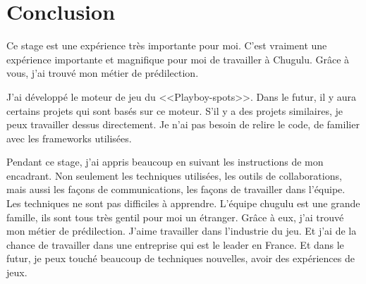\chapter{Conclusion}

Ce stage est une expérience très importante pour moi. C’est vraiment une expérience importante et magnifique pour moi de travailler à Chugulu. Grâce à vous, j’ai trouvé mon métier de prédilection.

J’ai développé le moteur de jeu du <<Playboy-spots>>. Dans le futur, il y aura certains projets qui sont basés sur ce moteur. S'il y a des projets similaires, je peux travailler dessus directement. Je n’ai pas besoin de relire le code, de familier avec les frameworks utilisées. 

Pendant ce stage, j’ai appris beaucoup en suivant les instructions de mon encadrant. Non seulement les techniques utilisées, les outils de collaborations, mais aussi les façons de communications, les façons de travailler dans l’équipe.  Les techniques ne sont pas difficiles à apprendre. L’équipe chugulu est une grande famille, ils sont tous très gentil pour moi un étranger. Grâce à eux, j’ai trouvé mon métier de prédilection. J’aime travailler dans l’industrie du jeu. Et j’ai de la chance de travailler dans une entreprise qui est le leader en France. Et dans le futur, je peux touché beaucoup de techniques nouvelles, avoir des expériences de jeux.
